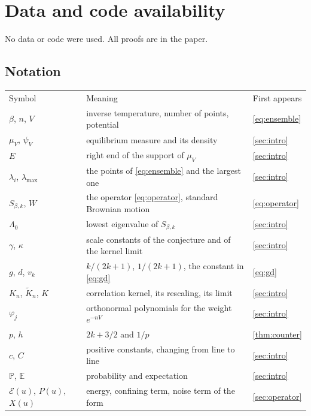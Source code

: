 \documentclass[11pt]{article}
\theoremstyle{remark}
\newcommand{\E}{\mathbb{E}}
\newcommand{\Prob}{\mathbb{P}}
\begin{document}
\section*{Data and code availability}

No data or code were used. All proofs are in the paper.

\begin{appendices}
\section{Notation}\label{app:notation}

\begin{tabular}{@{}>{\raggedright\arraybackslash}p{}>{\raggedright\arraybackslash}p{}>{\raggedright\arraybackslash}p{}@{}}
Symbol & Meaning & First appears\\[2pt]
$\beta$, $n$, $V$ & inverse temperature, number of points, potential & \eqref{eq:ensemble}\\
$\mu_V$, $\psi_V$ & equilibrium measure and its density & \cref{sec:intro}\\
$E$ & right end of the support of $\mu_V$ & \cref{sec:intro}\\
$\lambda_i$, $\lambda_{\max}$ & the points of \eqref{eq:ensemble} and the largest one & \cref{sec:intro}\\
$S_{\beta,k}$, $W$ & the operator \eqref{eq:operator}, standard Brownian motion & \eqref{eq:operator}\\
$\Lambda_0$ & lowest eigenvalue of $S_{\beta,k}$ & \cref{sec:intro}\\
$\gamma$, $\kappa$ & scale constants of the conjecture and of the kernel limit & \cref{sec:intro}\\
$g$, $d$, $v_k$ & $k/(2k+1)$, $1/(2k+1)$, the constant in \eqref{eq:gd} & \eqref{eq:gd}\\
$K_n$, $\widetilde K_n$, $K$ & correlation kernel, its rescaling, its limit & \cref{sec:intro}\\
$\varphi_j$ & orthonormal polynomials for the weight $e^{-nV}$ & \cref{sec:intro}\\
$p$, $h$ & $2k+3/2$ and $1/p$ & \cref{thm:counter}\\
$c$, $C$ & positive constants, changing from line to line & \cref{sec:intro}\\
$\Prob$, $\E$ & probability and expectation & \cref{sec:intro}\\
$\mathcal E(u)$, $P(u)$, $X(u)$ & energy, confining term, noise term of the form & \cref{sec:operator}\\

\end{tabular}
\end{appendices}
\end{document}

